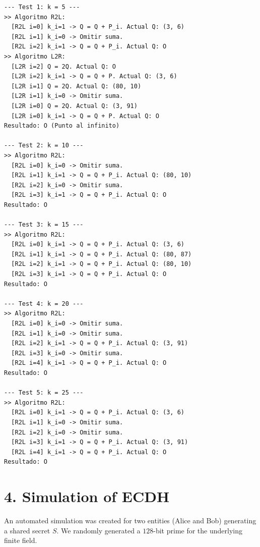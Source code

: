 \documentclass[12pt,a4paper]{article}
\begin{document}
\begin{verbatim}
--- Test 1: k = 5 ---
>> Algoritmo R2L:
  [R2L i=0] k_i=1 -> Q = Q + P_i. Actual Q: (3, 6)
  [R2L i=1] k_i=0 -> Omitir suma.
  [R2L i=2] k_i=1 -> Q = Q + P_i. Actual Q: O
>> Algoritmo L2R:
  [L2R i=2] Q = 2Q. Actual Q: O
  [L2R i=2] k_i=1 -> Q = Q + P. Actual Q: (3, 6)
  [L2R i=1] Q = 2Q. Actual Q: (80, 10)
  [L2R i=1] k_i=0 -> Omitir suma.
  [L2R i=0] Q = 2Q. Actual Q: (3, 91)
  [L2R i=0] k_i=1 -> Q = Q + P. Actual Q: O
Resultado: O (Punto al infinito)

--- Test 2: k = 10 ---
>> Algoritmo R2L:
  [R2L i=0] k_i=0 -> Omitir suma.
  [R2L i=1] k_i=1 -> Q = Q + P_i. Actual Q: (80, 10)
  [R2L i=2] k_i=0 -> Omitir suma.
  [R2L i=3] k_i=1 -> Q = Q + P_i. Actual Q: O
Resultado: O

--- Test 3: k = 15 ---
>> Algoritmo R2L:
  [R2L i=0] k_i=1 -> Q = Q + P_i. Actual Q: (3, 6)
  [R2L i=1] k_i=1 -> Q = Q + P_i. Actual Q: (80, 87)
  [R2L i=2] k_i=1 -> Q = Q + P_i. Actual Q: (80, 10)
  [R2L i=3] k_i=1 -> Q = Q + P_i. Actual Q: O
Resultado: O

--- Test 4: k = 20 ---
>> Algoritmo R2L:
  [R2L i=0] k_i=0 -> Omitir suma.
  [R2L i=1] k_i=0 -> Omitir suma.
  [R2L i=2] k_i=1 -> Q = Q + P_i. Actual Q: (3, 91)
  [R2L i=3] k_i=0 -> Omitir suma.
  [R2L i=4] k_i=1 -> Q = Q + P_i. Actual Q: O
Resultado: O

--- Test 5: k = 25 ---
>> Algoritmo R2L:
  [R2L i=0] k_i=1 -> Q = Q + P_i. Actual Q: (3, 6)
  [R2L i=1] k_i=0 -> Omitir suma.
  [R2L i=2] k_i=0 -> Omitir suma.
  [R2L i=3] k_i=1 -> Q = Q + P_i. Actual Q: (3, 91)
  [R2L i=4] k_i=1 -> Q = Q + P_i. Actual Q: O
Resultado: O
\end{verbatim}

\section*{4. Simulation of ECDH}
An automated simulation was created for two entities (Alice and Bob) generating a shared secret $S$. We randomly generated a $128$-bit prime for the underlying finite field.
\end{document}
